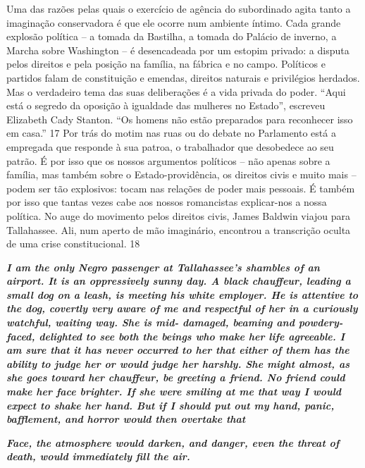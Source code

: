 Uma das razões pelas quais o exercício de agência do subordinado agita tanto a imaginação conservadora é que ele ocorre num ambiente íntimo. Cada grande explosão política – a tomada da Bastilha, a tomada do Palácio de inverno, a Marcha sobre Washington – é desencadeada por um estopim privado: a disputa pelos direitos e pela posição na família, na fábrica e no campo. Políticos e partidos falam de constituição e emendas, direitos naturais e privilégios herdados. Mas o verdadeiro tema das suas deliberações é a vida privada do poder. “Aqui está o segredo da oposição à igualdade das mulheres no Estado”, escreveu Elizabeth Cady Stanton. “Os homens não estão preparados para reconhecer isso em casa.”
 {\color{blue} 17}  
Por trás do motim nas ruas ou do debate no Parlamento está a empregada que responde à sua patroa, o trabalhador que desobedece ao seu patrão. É por isso que os nossos argumentos políticos – não apenas sobre a família, mas também sobre o Estado-providência, os direitos civis e muito mais – podem ser tão explosivos: tocam nas relações de poder mais pessoais. É também por isso que tantas vezes cabe aos nossos romancistas explicar-nos a nossa política. No auge do movimento pelos direitos civis, James Baldwin viajou para Tallahassee. Ali, num aperto de mão imaginário, encontrou a transcrição oculta de uma crise constitucional. 18
 
\par
 

 \textbf{\textit{I am the only Negro passenger at Tallahassee’s shambles of an airport. It is an oppressively sunny day. A black chauffeur, leading a small dog on a leash, is meeting his white employer. He is attentive to the dog, covertly very aware of me and respectful of her in a curiously watchful, waiting way. She is mid- damaged, beaming and powdery-faced, delighted to see both the beings who make her life agreeable. I am sure that it has never occurred to her that either of them has the ability to judge her or would judge her harshly. She might almost, as she goes toward her chauffeur, be greeting a friend. No friend could make her face brighter. If she were smiling at me that way I would expect to shake her hand. But if I should put out my hand, panic, bafflement, and horror would then overtake that} }  
 
 
\par
 

 
\par
 

 \textbf{\textit{Face, the atmosphere would darken, and danger, even the threat of death, would immediately fill the air.} }  
 
